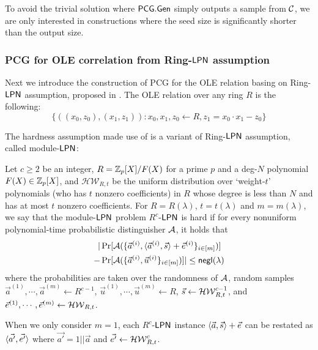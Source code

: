 To avoid the trivial solution where ${\sf PCG}.{\sf Gen}$ simply outputs a sample from $\mathcal{C}$, we are only interested in constructions where the seed size is significantly shorter than the output size.

\subsubsection{PCG for OLE correlation from Ring-${\sf LPN}$ assumption \cite{cryptoeprint:2022/1035}}\label{sec:PCG_OLE_protocol}
Next we introduce the construction of PCG for the OLE relation basing on Ring-${\sf LPN}$ assumption, proposed in \cite{cryptoeprint:2022/1035}. The OLE relation over any ring $R$ is the following: 
\[
\{\left((x_0, z_0),(x_1,z_1)\right): x_0,x_1,z_0\gets R, z_1 = x_0\cdot x_1 - z_0\}
\]

The hardness assumption made use of is a variant of Ring-${\sf LPN}$ assumption, called module-${\sf LPN}$: 
\begin{definition}\label{def:module-LPN}
    Let $c\ge 2$ be an integer, $R = \mathbb{Z}_p[X]/F(X)$ for a prime $p$ and a deg-$N$ polynomial $F(X)\in \mathbb{Z}_p[X]$, and $\mathcal{HW}_{R,t}$ be the uniform distribution over `weight-$t$' polynomials (who has $t$ nonzero coefficients) in $R$ whose degree is less than $N$ and has at most $t$ nonzero coefficients. 
     For $R=R(\lambda)$, $t=t(\lambda)$ and $m=m(\lambda)$, we say that the module-${\sf LPN}$ problem $R^c$-${\sf LPN}$ is hard if for every nonuniform polynomial-time probabilistic distinguisher $\mathcal{A}$, it holds that 
    \begin{align*}
        |&\Pr[\mathcal{A}(\{\vec{a}^{(i)}, \langle \vec{a}^{(i)}, \vec{s} \rangle+\vec{e}^{(i)}\}_{i\in [m]})] \\
        -&\Pr[\mathcal{A}(\{\vec{a}^{(i)},\vec{u}^{(i)}\}_{i\in [m]})]| \le \mathsf{negl}(\lambda)
    \end{align*}
    where the probabilities are taken over the randomness of $\mathcal{A}$, random samples $\vec{a}^{(1)},\cdots, \vec{a}^{(m)}\leftarrow R^{c-1}$, $\vec{u}^{(1)},\cdots, \vec{u}^{(m)}\leftarrow R$, $\vec{s}\leftarrow \mathcal{HW}_{R,t}^{c-1}$, and $\vec{e}^{(1)},\cdots, \vec{e}^{(m)}\leftarrow \mathcal{HW}_{R,t}$. 

    When we only consider $m=1$, each $R^c$-${\sf LPN}$ instance $ \langle \vec{a}, \vec{s} \rangle+\vec{e}$ can be restated as $\langle \vec{a'}, \vec{e'} \rangle$ where $\vec{a'}=1||\vec{a}$ and $\vec{e'}\leftarrow \mathcal{HW}_{R,t}^c$. 
\end{definition}


